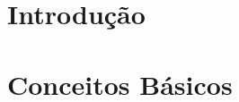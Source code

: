 \documentclass[
	12pt,				%
	openright,			%
	twoside,			%
	a4paper,			%
	english,			%
	french,				%
	spanish,			%
	brazil				%
	]{abntex2}
\begin{document}

\frenchspacing 




\part{Introdução}

%




\part{Conceitos Básicos}







\end{document}
